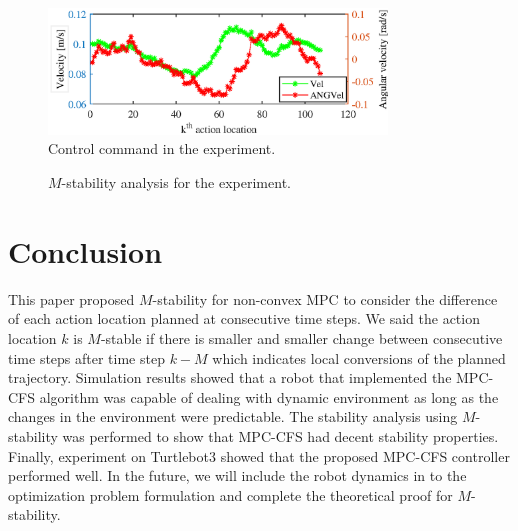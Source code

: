 \documentclass[letterpaper, 10 pt, conference]{ieeeconf}  %
\begin{document}
\begin{figure}[t]
      \centering
      \includegraphics[width=9cm]{plot/video_nice.eps}
      
      \caption{Control command in the experiment. }
      \label{fig:command}
\end{figure}

\begin{figure}[t]
      \centering
       
      \caption{$M$-stability analysis for the experiment. }
      \label{fig:msettling}
\end{figure}





\section{Conclusion}

This paper proposed $M$-stability for non-convex MPC to consider the difference of each action location planned at consecutive time steps. We said the action location $k$ is $M$-stable if there is smaller and smaller change between consecutive time steps after time step $k-M$ which indicates local conversions of the planned trajectory. Simulation results showed that a robot that implemented the MPC-CFS algorithm was capable of dealing with dynamic environment as long as the changes in the environment were predictable. The stability analysis using $M$-stability was performed to show that MPC-CFS had decent stability properties. Finally, experiment on Turtlebot3 showed that the proposed MPC-CFS controller performed well. In the future, we will include the robot dynamics in to the optimization problem formulation and complete the theoretical proof for $M$-stability. 





\end{document}
